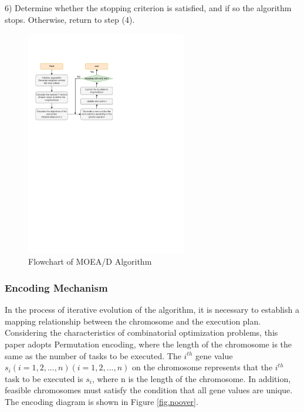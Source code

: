 \documentclass[10pt]{mcmthesis}
\begin{document}
    6) Determine whether the stopping criterion is satisfied, and if so the algorithm stops. Otherwise, return to step (4).


\begin{figure}[H]
    \centering
    \includegraphics[width=7.0cm]{figures/Moead.pdf}
    \caption{ Flowchart of MOEA/D Algorithm }%
    \label{fig.moead}
\end{figure} 
\vspace{-15pt}


\subsubsection{Encoding Mechanism}

In the process of iterative evolution of the algorithm, it is necessary to establish a mapping relationship between the chromosome and the execution plan. Considering the characteristics of combinatorial optimization problems, this paper adopts Permutation encoding, where the length of the chromosome is the same as the number of tasks to be executed. The $i^{th}$  gene value $s_i  (i=1,2,...,n) (i = 1, 2, ..., n) $ on the chromosome represents that the $i^{th}$ task to be executed is $s_i$, where n is the length of the chromosome. In addition, feasible chromosomes must satisfy the condition that all gene values are unique. The encoding diagram is shown in Figure \ref{fig.noover}.
\end{document}
